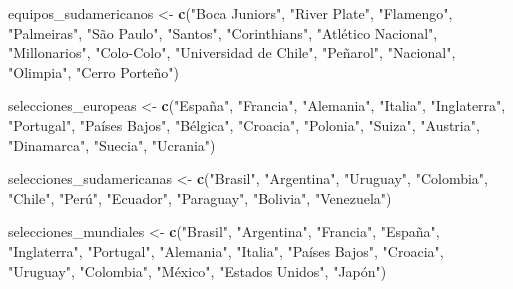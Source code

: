 \documentclass[
]{article}
\newenvironment{Shaded}{\begin{snugshade}}{\end{snugshade}}
\newcommand{\FunctionTok}[1]{\textcolor[rgb]{0.13,0.29,0.53}{\textbf{#1}}}
\newcommand{\NormalTok}[1]{#1}
\newcommand{\OtherTok}[1]{\textcolor[rgb]{0.56,0.35,0.01}{#1}}
\newcommand{\StringTok}[1]{\textcolor[rgb]{0.31,0.60,0.02}{#1}}
\begin{document}
\begin{Shaded}
\begin{Highlighting}[]
\NormalTok{equipos\_sudamericanos }\OtherTok{\textless{}{-}} \FunctionTok{c}\NormalTok{(}\StringTok{"Boca Juniors"}\NormalTok{, }\StringTok{"River Plate"}\NormalTok{, }\StringTok{"Flamengo"}\NormalTok{, }\StringTok{"Palmeiras"}\NormalTok{,}
                          \StringTok{"São Paulo"}\NormalTok{, }\StringTok{"Santos"}\NormalTok{, }\StringTok{"Corinthians"}\NormalTok{, }\StringTok{"Atlético Nacional"}\NormalTok{,}
                          \StringTok{"Millonarios"}\NormalTok{, }\StringTok{"Colo{-}Colo"}\NormalTok{, }\StringTok{"Universidad de Chile"}\NormalTok{, }\StringTok{"Peñarol"}\NormalTok{,}
                          \StringTok{"Nacional"}\NormalTok{, }\StringTok{"Olimpia"}\NormalTok{, }\StringTok{"Cerro Porteño"}\NormalTok{)}

\NormalTok{selecciones\_europeas }\OtherTok{\textless{}{-}} \FunctionTok{c}\NormalTok{(}\StringTok{"España"}\NormalTok{, }\StringTok{"Francia"}\NormalTok{, }\StringTok{"Alemania"}\NormalTok{, }\StringTok{"Italia"}\NormalTok{, }\StringTok{"Inglaterra"}\NormalTok{,}
                         \StringTok{"Portugal"}\NormalTok{, }\StringTok{"Países Bajos"}\NormalTok{, }\StringTok{"Bélgica"}\NormalTok{, }\StringTok{"Croacia"}\NormalTok{, }\StringTok{"Polonia"}\NormalTok{,}
                         \StringTok{"Suiza"}\NormalTok{, }\StringTok{"Austria"}\NormalTok{, }\StringTok{"Dinamarca"}\NormalTok{, }\StringTok{"Suecia"}\NormalTok{, }\StringTok{"Ucrania"}\NormalTok{)}

\NormalTok{selecciones\_sudamericanas }\OtherTok{\textless{}{-}} \FunctionTok{c}\NormalTok{(}\StringTok{"Brasil"}\NormalTok{, }\StringTok{"Argentina"}\NormalTok{, }\StringTok{"Uruguay"}\NormalTok{, }\StringTok{"Colombia"}\NormalTok{, }\StringTok{"Chile"}\NormalTok{,}
                              \StringTok{"Perú"}\NormalTok{, }\StringTok{"Ecuador"}\NormalTok{, }\StringTok{"Paraguay"}\NormalTok{, }\StringTok{"Bolivia"}\NormalTok{, }\StringTok{"Venezuela"}\NormalTok{)}

\NormalTok{selecciones\_mundiales }\OtherTok{\textless{}{-}} \FunctionTok{c}\NormalTok{(}\StringTok{"Brasil"}\NormalTok{, }\StringTok{"Argentina"}\NormalTok{, }\StringTok{"Francia"}\NormalTok{, }\StringTok{"España"}\NormalTok{, }\StringTok{"Inglaterra"}\NormalTok{,}
                          \StringTok{"Portugal"}\NormalTok{, }\StringTok{"Alemania"}\NormalTok{, }\StringTok{"Italia"}\NormalTok{, }\StringTok{"Países Bajos"}\NormalTok{, }\StringTok{"Croacia"}\NormalTok{,}
                          \StringTok{"Uruguay"}\NormalTok{, }\StringTok{"Colombia"}\NormalTok{, }\StringTok{"México"}\NormalTok{, }\StringTok{"Estados Unidos"}\NormalTok{, }\StringTok{"Japón"}\NormalTok{)}


\end{Highlighting}
\end{Shaded}
\end{document}
